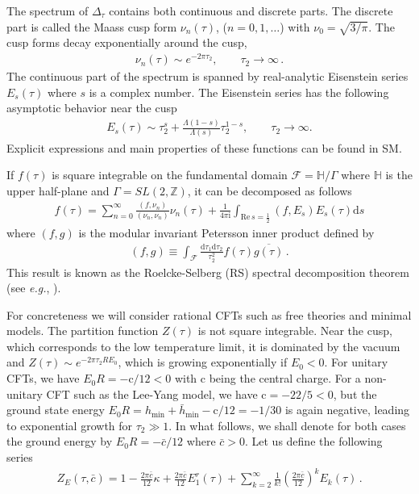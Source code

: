 \documentclass[aps,twocolumn,prl,showpacs,amsmath,amssymb,10pt]{revtex4-2}
\def\tc{\bar{c}}
\begin{document}
\vspace{0.3cm}
The spectrum of $\Delta_{\tau}$ contains both continuous and discrete parts. The discrete part is called the Maass cusp form $\nu_n(\tau)$, ($n=0,1,\ldots$) with $\nu_0=\sqrt{3/\pi}$. The cusp forms decay exponentially around the cusp,
\begin{align}
\nu_n(\tau)\sim e^{-2\pi \tau_2},\qquad \tau_2\to\infty\,.
\end{align}
The continuous part of the spectrum is spanned by real-analytic Eisenstein series $E_s(\tau)$ where $s$ is a complex number. The Eisenstein series has the following asymptotic behavior near the cusp
\begin{align}
\label{eq:asymEs}
E_s(\tau)\sim \tau_2^s+\frac{\Lambda(1-s)}{\Lambda(s)}\tau_2^{1-s},\qquad \tau_2\to\infty.
\end{align}
Explicit expressions and main properties of these functions can be found in SM.

If $f(\tau)$ is square integrable on the fundamental domain $\mathcal{F}=\mathbb{H}/\Gamma$ where $\mathbb{H}$ is the upper half-plane and $\Gamma=SL(2,\mathbb{Z})$, it can be decomposed as follows
\begin{align}
f(\tau)=\sum_{n=0}^{\infty}\frac{(f,\nu_n)}{(\nu_n,\nu_n)}\nu_n(\tau)+\frac{1}{4\pi\mathrm{i}}\int_{\text{Re}\,s=\frac{1}{2}}(f,E_s)E_s(\tau)\mathrm{d}s
\end{align}
where $(f,g)$ is the modular invariant Petersson inner product defined by
\begin{align}
(f,g)\equiv\int_{\mathcal{F}}\frac{\mathrm{d}\tau_1\mathrm{d}\tau_2}{\tau_2^2}f(\tau)\overline{g(\tau)}\,.
\end{align}
This result is known as the Roelcke-Selberg (RS) spectral decomposition theorem (see \emph{e.g.}, \cite{terras2013harmonic}).

\vspace{0.3cm}
 For concreteness we will consider rational CFTs such as free theories and minimal models. The partition function $Z(\tau)$ is not square integrable. Near the cusp, which corresponds to the low temperature limit, it is dominated by the vacuum and $Z(\tau)\sim e^{-2\pi \tau_2 RE_0}$, which is growing exponentially if $E_0<0$. For unitary CFTs, we have $E_0R=-\mathrm{c}/12<0$ with $\mathrm{c}$ being the central charge. For a non-unitary CFT such as the Lee-Yang model, we have $\mathrm{c}=-22/5<0$, but the ground state energy $E_0 R=h_{\text{min}}+\bar{h}_{\text{min}}-\mathrm{c}/12=-1/30$ is again negative, leading to exponential growth for $\tau_2\gg 1$. In what follows, we shall denote for both cases the ground energy by $E_0R=-\tc/12$ where $\tc>0$. Let us define the following series
\begin{align}
\label{eq:defZE}
Z_E(\tau,\tc)=1-\frac{2\pi \tc}{12}\kappa+\frac{2\pi \tc}{12}E_1^r(\tau)+\sum_{k=2}^{\infty}\frac{1}{k!}\left(\frac{2\pi \tc}{12}\right)^k E_k(\tau)\,.
\end{align}
\end{document}

